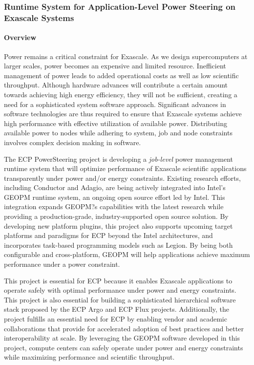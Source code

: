 \subsubsection{ Runtime System for Application-Level Power Steering on Exascale Systems} 

\paragraph{Overview} 
Power remains a critical constraint for Exascale. As we design supercomputers at larger scales, power becomes an expensive and limited resource. Inefficient management of power leads to added operational costs as well as low scientific throughput. Although hardware advances will contribute a certain amount towards achieving high energy efficiency, they will not be sufficient, creating a need for a sophisticated system software approach. Significant advances in software technologies are thus required to ensure that Exascale systems achieve high performance with effective utilization of available power. Distributing available power to nodes while adhering to system, job and node constraints involves complex decision making in software. 

The ECP PowerSteering project is developing a \emph{job-level} power management runtime system that will optimize performance of Exascale scientific applications transparently under power and/or energy constraints. Existing research efforts, including Conductor and Adagio, are being actively integrated into Intel's GEOPM runtime system, an ongoing open source effort led by Intel. This integration expands GEOPM?s capabilities with the latest research while providing a production-grade, industry-supported open source solution. By developing new platform plugins, this project also supports upcoming target platforms and paradigms for ECP beyond the Intel architectures, and incorporates task-based programming models such as Legion. By being both configurable and cross-platform, GEOPM will help applications achieve maximum performance under a power constraint. 

This project is essential for ECP because it enables Exascale applications to operate safely with optimal performance under power and energy constraints. This project is also essential for building a sophisticated hierarchical software stack proposed by the ECP Argo and ECP Flux projects. Additionally, the project fulfills an essential need for ECP by enabling vendor and academic collaborations that provide for accelerated adoption of best practices and better interoperability at scale.  By leveraging the GEOPM software developed in this project, compute centers can safely operate under power and energy constraints while maximizing performance and scientific throughput. 


